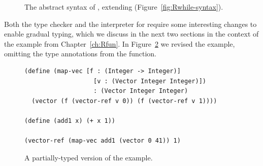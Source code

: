 \documentclass[11pt]{book}
\newcommand{\gray}[1]{{\color{gray} #1}}
\begin{document}
\begin{figure}[tp]
\centering
\fbox{
  \begin{minipage}{0.96\textwidth}
    \small
\[
\begin{array}{lcl}
  \itm{param} &::=& \Var \mid \LS\Var \key{:} \Type\RS \\
  \Exp &::=& \gray{ \INT{\Int} \VAR{\Var} \mid \LET{\Var}{\Exp}{\Exp} } \\
       &\mid& \gray{ \PRIM{\itm{op}}{\Exp\ldots} }\\
     &\mid& \gray{ \BOOL{\itm{bool}}
      \mid \IF{\Exp}{\Exp}{\Exp} } \\
     &\mid& \gray{ \VOID{} \mid \LP\key{HasType}~\Exp~\Type \RP 
     \mid \APPLY{\Exp}{\Exp\ldots} }\\
  &\mid& \LAMBDA{\LP\itm{param}\ldots\RP}{\Type}{\Exp} \\
  &\mid& \gray{ \SETBANG{\Var}{\Exp} \mid \BEGIN{\LP\Exp\ldots\RP}{\Exp} } \\
  &\mid& \gray{ \WHILE{\Exp}{\Exp} } \\
 \Def &::=& \FUNDEF{\Var}{\LP\itm{param}\ldots\RP}{\Type}{\code{'()}}{\Exp} \\
  \LangGrad{} &::=& \gray{ \PROGRAMDEFSEXP{\code{'()}}{\LP\Def\ldots\RP}{\Exp} }
\end{array}
\]
\end{minipage}
}
\caption{The abstract syntax of \LangGrad{}, extending \LangLoop{} (Figure~\ref{fig:Rwhile-syntax}).}
\label{fig:Rgrad-syntax}
\end{figure}



Both the type checker and the interpreter for \LangGrad{} require some
interesting changes to enable gradual typing, which we discuss in the
next two sections in the context of the  example from
Chapter~\ref{ch:Rfun}.  In Figure~\ref{fig:gradual-map-vec} we
revised the  example, omitting the type annotations from
the  function.

\begin{figure}[btp]
\begin{lstlisting}
(define (map-vec [f : (Integer -> Integer)]
                   [v : (Vector Integer Integer)])
                   : (Vector Integer Integer)
  (vector (f (vector-ref v 0)) (f (vector-ref v 1))))

(define (add1 x) (+ x 1))

(vector-ref (map-vec add1 (vector 0 41)) 1)
\end{lstlisting}
\caption{A partially-typed version of the  example.}
\label{fig:gradual-map-vec}
\end{figure}
\end{document}
